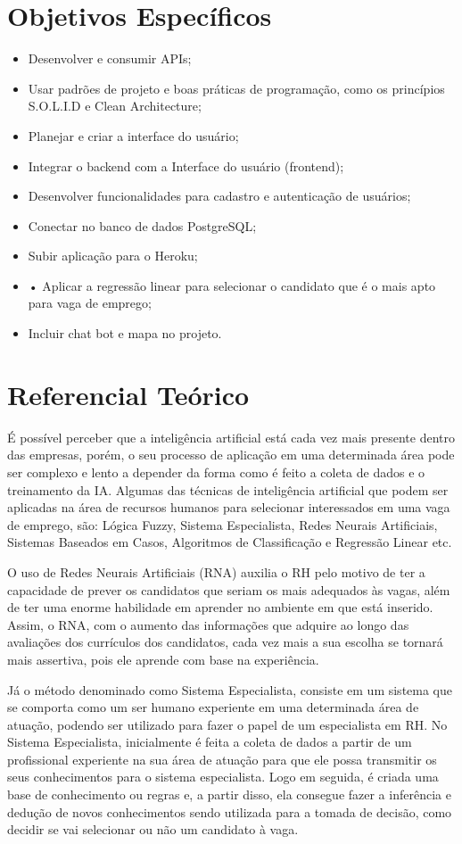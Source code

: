 \documentclass[conference]{IEEEtran}
\begin{document}
\section{Objetivos Específicos}
\begin{itemize}
\item Desenvolver e consumir APIs; 
\item Usar padrões de projeto e boas práticas de programação, como os princípios S.O.L.I.D e Clean Architecture; 
\item Planejar e criar a interface do usuário;
\item Integrar o backend com a Interface do usuário (frontend); 
\item Desenvolver funcionalidades para cadastro e autenticação de usuários;
\item Conectar no banco de dados PostgreSQL;
\item Subir aplicação para o Heroku;
\item •	Aplicar a regressão linear para selecionar o candidato que é o mais apto para vaga de emprego;
\item Incluir chat bot e mapa no projeto.
\end{itemize}

\section{Referencial Teórico}
É possível perceber que a inteligência artificial está cada vez mais presente dentro das empresas, porém, o seu processo de aplicação em uma determinada área pode ser complexo e lento a depender da forma como é feito a coleta de dados e o treinamento da IA. Algumas das técnicas de inteligência artificial que podem ser aplicadas na área de recursos humanos para selecionar interessados em uma vaga de emprego, são: Lógica Fuzzy, Sistema Especialista, Redes Neurais Artificiais, Sistemas Baseados em Casos, Algoritmos de Classificação e Regressão Linear etc.

O uso de Redes Neurais Artificiais (RNA) auxilia o RH pelo motivo de ter a capacidade de prever os candidatos que seriam os mais adequados às vagas, além de ter uma enorme habilidade em aprender no ambiente em que está inserido. Assim, o RNA, com o aumento das informações que adquire ao longo das avaliações dos currículos dos candidatos, cada vez mais a sua escolha se tornará mais assertiva, pois ele aprende com base na experiência.

Já o método denominado como Sistema Especialista, consiste em um sistema que se comporta como um ser humano experiente em uma determinada área de atuação, podendo ser utilizado para fazer o papel de um especialista em RH. No Sistema Especialista, inicialmente é feita a coleta de dados a partir de um profissional experiente na sua área de atuação para que ele possa transmitir os seus conhecimentos para o sistema especialista. Logo em seguida, é criada uma base de conhecimento ou regras e, a partir disso, ela consegue fazer a inferência e dedução de novos conhecimentos sendo utilizada para a tomada de decisão, como decidir se vai selecionar ou não um candidato à vaga. 
\end{document}
